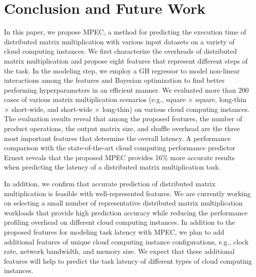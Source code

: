 \documentclass[10pt, conference, compsocconf]{IEEEtran}
\begin{document}
\section{Conclusion and Future Work}
In this paper, we propose MPEC, a method for predicting the execution time of distributed matrix multiplication with various input datasets on a variety of cloud computing instances. We first characterize the overheads of distributed matrix multiplication and propose eight features that represent different steps of the task. In the modeling step, we employ a GB regressor to model non-linear interactions among the features and Bayesian optimization to find better performing hyperparameters in an efficient manner. We evaluated more than 200 cases of various matrix multiplication scenarios (e.g., square $\times$ square, long-thin $\times$ short-wide, and short-wide $\times$ long-thin) on various cloud computing instances. The evaluation results reveal that among the proposed features, the number of product operations, the output matrix size, and shuffle overhead are the three most important features that  determine the overall latency. A performance comparison with the state-of-the-art cloud computing performance predictor Ernest reveals that the proposed MPEC provides 16\% more accurate results when predicting the latency of a distributed matrix multiplication task.

In addition, we confirm that accurate prediction of distributed matrix multiplication is feasible with well-represented features. We are currently working on selecting a small number of representative distributed matrix multiplication workloads that provide high prediction accuracy while reducing the performance profiling overhead on different cloud computing instances. In addition to the proposed features for modeling task latency with MPEC, we plan to add additional features of unique cloud computing instance configurations, e.g., clock rate, network bandwidth, and memory size. We expect that these additional features will help to predict the task latency of different types of cloud computing instances.


\end{document}
